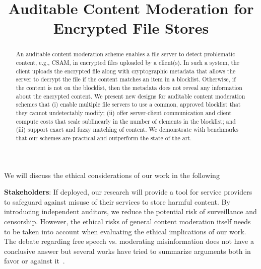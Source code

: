\documentclass[conference,compsoc]{IEEEtran}
\begin{document}
\title{Auditable Content Moderation for Encrypted File Stores}

\maketitle


\begin{abstract}
An auditable content moderation scheme enables a file server to detect problematic content, e.g., CSAM, in encrypted files uploaded by a client(s). In such a system, the client uploads the encrypted file along with cryptographic metadata that allows the server to decrypt the file if the content matches an item in a blocklist. Otherwise, if the content is not on the blocklist, then the metadata does not reveal any information about the encrypted content.  We present new designs for auditable content moderation schemes that (i) enable multiple file servers to use a common, approved blocklist that they cannot undetectably modify; (ii) offer server-client communication and client compute costs that scale sublinearly in the number of elements in the blocklist; and (iii) support exact and fuzzy matching of content.  We demonstrate with benchmarks that our schemes are practical and outperform the state of the art. 
\end{abstract}






 
% 
%
%
%
%






\iffalse
We will discuss the ethical considerations of our work in the following

\enumListStart
\item \textbf{Stakeholders}: If deployed, our research will provide a tool for service providers to safeguard against misuse of their services to store harmful content. By introducing independent auditors, we reduce the potential risk of surveillance and censorship. However, the ethical risks of general content moderation itself needs to be taken into account when evaluating the ethical implications of our work. The debate regarding free speech vs. moderating misinformation does not have a conclusive answer but several works have tried to summarize arguments both in favor or against it~\cite{kozyreva2023resolving}. 
\end{document}
